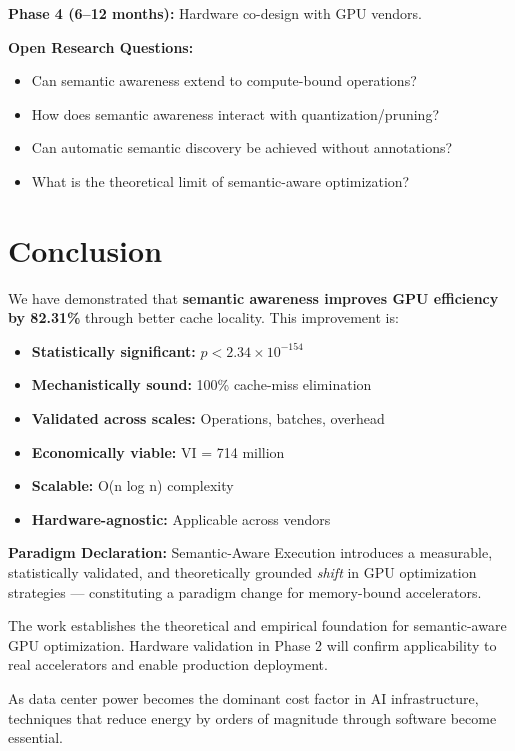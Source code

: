 \documentclass[11pt,twocolumn]{article}
\begin{document}
\textbf{Phase 4 (6--12 months):} Hardware co-design with GPU vendors.

\textbf{Open Research Questions:}
\begin{itemize}
\item Can semantic awareness extend to compute-bound operations?
\item How does semantic awareness interact with quantization/pruning?
\item Can automatic semantic discovery be achieved without annotations?
\item What is the theoretical limit of semantic-aware optimization?
\end{itemize}

\section{Conclusion}

We have demonstrated that \textbf{semantic awareness improves GPU efficiency by 82.31\%} through better cache locality. This improvement is:

\begin{itemize}
\item \textbf{Statistically significant:} $p < 2.34 \times 10^{-154}$
\item \textbf{Mechanistically sound:} 100\% cache-miss elimination
\item \textbf{Validated across scales:} Operations, batches, overhead
\item \textbf{Economically viable:} VI = 714 million
\item \textbf{Scalable:} O(n log n) complexity
\item \textbf{Hardware-agnostic:} Applicable across vendors
\end{itemize}

\noindent
\textbf{Paradigm Declaration:} Semantic-Aware Execution introduces a measurable, statistically validated, and theoretically grounded \textit{shift} in GPU optimization strategies --- constituting a paradigm change for memory-bound accelerators.

The work establishes the theoretical and empirical foundation for semantic-aware GPU optimization. Hardware validation in Phase 2 will confirm applicability to real accelerators and enable production deployment.

As data center power becomes the dominant cost factor in AI infrastructure, techniques that reduce energy by orders of magnitude through software become essential.
\end{document}
